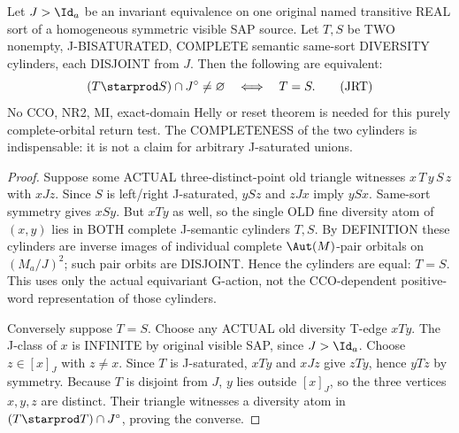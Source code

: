 \begin{lemma}
\label{lem:typed-complete-J-cylinder-return}
Let $J>\Id_a$ be an invariant equivalence on
one original named transitive REAL sort of a
homogeneous symmetric visible SAP source.
Let $T,S$ be TWO nonempty, J-BISATURATED,
COMPLETE semantic same-sort DIVERSITY
cylinders, each DISJOINT from $J$.
Then the following are equivalent:
\[
        (T\starprod S)\cap J^\circ
                \ne\varnothing
             \quad\Longleftrightarrow\quad T=S.
\tag{JRT}\label{eq:typed-complete-J-cylinder-return}
\]
No CCO, NR2, MI, exact-domain Helly
or reset theorem is needed for this
purely complete-orbital return test.
The COMPLETENESS of the two cylinders
is indispensable: it is not a claim
for arbitrary J-saturated unions.
\end{lemma}
\begin{proof}
Suppose some ACTUAL three-distinct-point
old triangle witnesses
$x\,T\,y\,S\,z$ with $xJz$.
Since $S$ is left/right J-saturated,
$ySz$ and $zJx$ imply $ySx$.
Same-sort symmetry gives $xSy$.
But $xTy$ as well, so the
single OLD fine diversity atom
of $(x,y)$ lies in BOTH complete
J-semantic cylinders $T,S$.
By DEFINITION these cylinders
are inverse images of individual
complete $\Aut(M)$-pair orbitals
on $(M_a/J)^2$; such pair orbits
are DISJOINT. Hence the cylinders
are equal: $T=S$. This uses only
the actual equivariant G-action,
not the CCO-dependent positive-word
representation of those cylinders.

Conversely suppose $T=S$.
Choose any ACTUAL old diversity
T-edge $xTy$.
The J-class of $x$ is INFINITE
by original visible SAP, since
$J>\Id_a$. Choose $z\in[x]_J$
with $z\ne x$. Since $T$ is
J-saturated, $xTy$ and $xJz$
give $zTy$, hence $yTz$
by symmetry. Because $T$ is
disjoint from $J$, $y$ lies
outside $[x]_J$, so the three
vertices $x,y,z$ are distinct.
Their triangle witnesses a
diversity atom in
$(T\starprod T)\cap J^\circ$,
proving the converse.
\end{proof}

